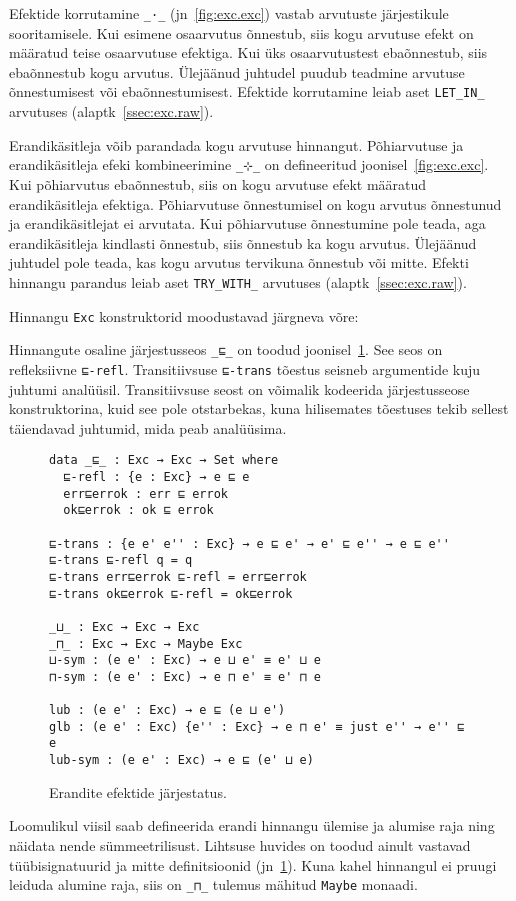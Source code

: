 \documentclass[a4paper,12pt]{article}
\begin{document}
Efektide korrutamine {\tt _·_} (jn~\ref{fig:exc.exc}) vastab arvutuste järjestikule sooritamisele.
Kui esimene osaarvutus õnnestub, siis kogu arvutuse efekt on määratud teise osaarvutuse efektiga.
Kui üks osaarvutustest ebaõnnestub, siis ebaõnnestub kogu arvutus.
Ülejäänud juhtudel puudub teadmine arvutuse õnnestumisest või ebaõnnestumisest.
Efektide korrutamine leiab aset {\tt LET_IN_} arvutuses (alaptk~\ref{ssec:exc.raw}).

Erandikäsitleja võib parandada kogu arvutuse hinnangut.
Põhiarvutuse ja erandikäsitleja efeki kombineerimine {\tt _⊹_} on defineeritud joonisel~\ref{fig:exc.exc}.
Kui põhiarvutus ebaõnnestub, siis on kogu arvutuse efekt määratud erandikäsitleja efektiga.
Põhiarvutuse õnnestumisel on kogu arvutus õnnestunud ja erandikäsitlejat ei arvutata.
Kui põhiarvutuse õnnestumine pole teada, aga erandikäsitleja kindlasti õnnestub, siis õnnestub ka kogu arvutus.
Ülejäänud juhtudel pole teada, kas kogu arvutus tervikuna õnnestub või mitte.
Efekti hinnangu parandus leiab aset {\tt TRY_WITH_} arvutuses (alaptk~\ref{ssec:exc.raw}).

Hinnangu {\tt Exc} konstruktorid moodustavad järgneva võre:
\begin{center}
\end{center}
Hinnangute osaline järjestusseos {\tt _⊑_} on toodud joonisel~\ref{fig:exc.ord}.
See seos on refleksiivne {\tt ⊑-refl}.
Transitiivsuse {\tt ⊑-trans} tõestus seisneb argumentide kuju juhtumi analüüsil.
Transitiivsuse seost on võimalik kodeerida järjestusseose konstruktorina, kuid see pole otstarbekas,
kuna hilisemates tõestuses tekib sellest täiendavad juhtumid, mida peab analüüsima.

\begin{figure}
  \begin{verbatim}
data _⊑_ : Exc → Exc → Set where
  ⊑-refl : {e : Exc} → e ⊑ e
  err⊑errok : err ⊑ errok
  ok⊑errok : ok ⊑ errok
  
⊑-trans : {e e' e'' : Exc} → e ⊑ e' → e' ⊑ e'' → e ⊑ e''
⊑-trans ⊑-refl q = q
⊑-trans err⊑errok ⊑-refl = err⊑errok
⊑-trans ok⊑errok ⊑-refl = ok⊑errok

_⊔_ : Exc → Exc → Exc
_⊓_ : Exc → Exc → Maybe Exc
⊔-sym : (e e' : Exc) → e ⊔ e' ≡ e' ⊔ e
⊓-sym : (e e' : Exc) → e ⊓ e' ≡ e' ⊓ e

lub : (e e' : Exc) → e ⊑ (e ⊔ e')
glb : (e e' : Exc) {e'' : Exc} → e ⊓ e' ≡ just e'' → e'' ⊑ e
lub-sym : (e e' : Exc) → e ⊑ (e' ⊔ e)
  \end{verbatim}
  \caption{Erandite efektide järjestatus.}
  \label{fig:exc.ord}
\end{figure}
Loomulikul viisil saab defineerida erandi hinnangu ülemise ja alumise raja ning näidata nende sümmeetrilisust.
Lihtsuse huvides on toodud ainult vastavad tüübisignatuurid ja mitte definitsioonid (jn~\ref{fig:exc.ord}).
Kuna kahel hinnangul ei pruugi leiduda alumine raja, siis on {\tt _⊓_} tulemus mähitud {\tt Maybe} monaadi.
\end{document}
